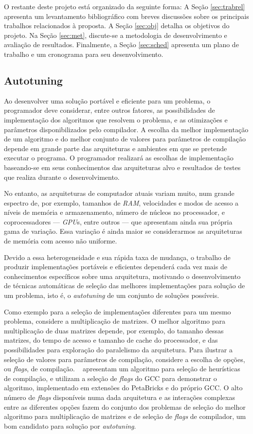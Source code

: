 \documentclass[a4paper, 11pt]{article}
\begin{document}
O restante deste projeto está organizado da seguinte forma: 
A Seção \ref{sec:trabrel} apresenta um levantamento bibliográfico com breves
discussões sobre os principais trabalhos relacionados à proposta.
A Seção \ref{sec:obj} detalha os objetivos do projeto. Na Seção 
\ref{sec:met}, discute-se a metodologia de desenvolvimento e avaliação de 
resultados. Finalmente, a Seção \ref{sec:sched} apresenta um plano de trabalho
e um cronograma para seu desenvolvimento. 

\subsection{Autotuning} \label{sec:autotuning}

Ao desenvolver uma solução portável e eficiente para um problema, o
programador deve considerar, entre outros fatores, as possibilidades
de implementação dos algoritmos que resolvem o problema, e as otimizações e 
parâmetros disponibilizados pelo compilador.
A escolha da melhor implementação de um algoritmo e do melhor conjunto de 
valores para parâmetros de compilação depende em grande parte das arquiteturas
e ambientes em que se pretende executar o programa. O programador realizará 
as escolhas de implementação baseando-se em seus conhecimentos das arquiteturas
alvo e resultados de testes que realiza durante o desenvolvimento.

No entanto, as arquiteturas de computador atuais variam muito, num grande 
espectro de, por exemplo, tamanhos de \emph{RAM},
velocidades e modos de acesso a níveis de memória e armazenamento, número de 
núcleos no processador, e coprocessadores --- \emph{GPU}s, entre outros 
--- que apresentam ainda sua própria gama de variação. Essa variação é
ainda maior se considerarmos as arquiteturas de memória com acesso 
não uniforme.

Devido a essa heterogeneidade e sua rápida taxa de mudança, 
o trabalho de produzir implementações portáveis e eficientes 
dependerá cada vez mais de conhecimentos específicos sobre uma arquitetura,
motivando o desenvolvimento de técnicas automáticas de seleção das melhores
implementações para solução de um problema, isto é, o \emph{autotuning} de um
conjunto de soluções possíveis.

Como exemplo para a seleção de implementações diferentes para um mesmo
problema, considere a multiplicação de matrizes. O melhor algoritmo
para multiplicação de duas matrizes depende, por exemplo, do tamanho dessas
matrizes, do tempo de acesso e tamanho de cache do processador, e das 
possibilidades para exploração do paralelismo da arquitetura.
Para ilustrar a seleção de valores para parâmetros de compilação, considere
a escolha de opções, ou \emph{flags}, de compilação.
~\citet{tartara2013heuristics} apresentam um algoritmo para seleção de 
heurísticas de compilação, e utilizam a seleção de \emph{flags}
do GCC para demonstrar o algoritmo, implementado em extensões do PetaBricks e 
do próprio GCC. 
O alto número de \emph{flags} disponíveis numa dada arquitetura e as interações
complexas entre as diferentes opções fazem do conjunto dos problemas de 
seleção do melhor algoritmo para multiplicação de matrizes e de seleção de 
\emph{flags} de compilador, um bom candidato para solução por 
\emph{autotuning}.
\end{document}
